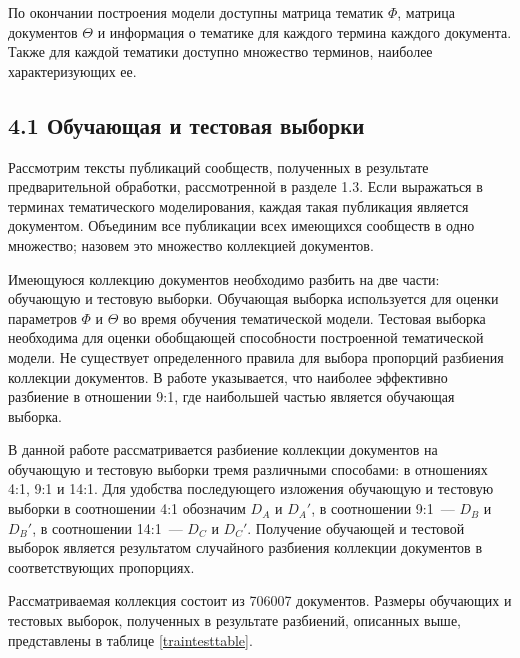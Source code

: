 \documentclass[a4paper]{report}
\begin{document}
	
	
	По окончании построения модели доступны матрица тематик $\Phi$, матрица документов $\Theta$ и информация о тематике для каждого термина каждого документа. Также для каждой тематики доступно множество терминов, наиболее характеризующих ее.
	
	\subsection{4.1 Обучающая и тестовая выборки}
	
	Рассмотрим тексты публикаций сообществ, полученных в результате предварительной обработки, рассмотренной в разделе 1.3. Если выражаться в терминах тематического моделирования, каждая такая публикация является документом. Объединим все публикации всех имеющихся сообществ в одно множество; назовем это множество коллекцией документов.
	
	Имеющуюся коллекцию документов необходимо разбить на две части: обучающую и тестовую выборки.
	Обучающая выборка используется для оценки параметров $\Phi$ и $\Theta$ во время обучения тематической модели.
	 Тестовая выборка необходима для оценки обобщающей способности построенной тематической модели. 
	 Не существует определенного правила для выбора пропорций разбиения коллекции документов. В работе \cite{bib:Voron1} указывается, что наиболее эффективно разбиение в отношении 9:1, где наибольшей частью является обучающая выборка.
	
	В данной работе рассматривается разбиение коллекции документов на обучающую и тестовую выборки тремя различными способами: в отношениях 4:1, 9:1 и 14:1.  Для удобства последующего изложения обучающую и тестовую выборки в соотношении 4:1 обозначим $D_A$ и $D_A'$, в соотношении 9:1~--- $D_B$ и $D_B'$, в соотношении 14:1~--- $D_C$ и $D_C'$. Получение обучающей и тестовой выборок является результатом случайного разбиения коллекции документов в соответствующих пропорциях. 
	
	Рассматриваемая коллекция состоит из 706007 документов. Размеры обучающих и тестовых выборок, полученных в результате разбиений, описанных выше, представлены в таблице \ref{traintesttable}.
	\newline
	
\end{document}
